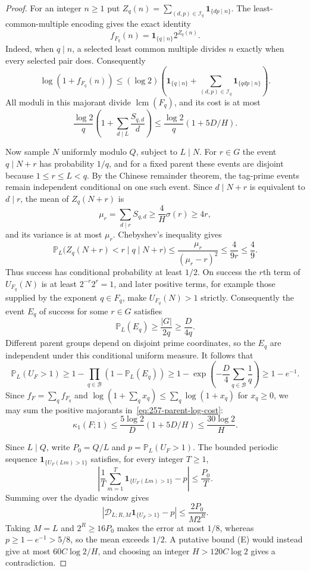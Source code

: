\begin{proof}
For an integer $n\ge1$ put
$Z_q(n)=\sum_{(d,p)\in\mathcal I_q}\mathbf1_{\{dp\mid n\}}$.
The least-common-multiple encoding gives the exact identity
\[
 f_{F_q}(n)=\mathbf1_{\{q\mid n\}}2^{Z_q(n)}.
\]
Indeed, when $q\mid n$, a selected least common multiple divides $n$
exactly when every selected pair does.  Consequently
\[
 \log(1+f_{F_q}(n))
 \le(\log2)\left(\mathbf1_{\{q\mid n\}}
          +\sum_{(d,p)\in\mathcal I_q}\mathbf1_{\{qdp\mid n\}}\right).
\]
All moduli in this majorant divide $\operatorname{lcm}(F_q)$,
and its cost is at most
\begin{equation}
 \frac{\log2}{q}\left(1+\sum_{d\mid L}\frac{S_{q,d}}d\right)
 \le\frac{\log2}{q}(1+5D/H).
 \label{eq:257-parent-log-cost}
\end{equation}

Now sample $N$ uniformly modulo $Q$, subject to $L\mid N$.
For $r\in G$ the event $q\mid N+r$ has probability $1/q$, and
for a fixed parent these events are disjoint because $1\le r\le L<q$.
By the Chinese remainder theorem, the tag-prime events remain independent
conditional on one such event.  Since $d\mid N+r$ is equivalent to
$d\mid r$, the mean of $Z_q(N+r)$ is
\[
 \mu_r=\sum_{d\mid r}S_{q,d}
 \ge\frac4H\sigma(r)\ge4r,
\]
and its variance is at most $\mu_r$.
Chebyshev's inequality gives
\[
 \mathbb P_L\bigl(Z_q(N+r)<r\mid q\mid N+r\bigr)
 \le\frac{\mu_r}{(\mu_r-r)^2}
 \le\frac4{9r}\le\frac49.
\]
Thus success has conditional probability at least $1/2$.
On success the $r$th term of $U_{F_q}(N)$ is at least
$2^{-r}2^r=1$, and later positive terms, for example those supplied by the
exponent $q\in F_q$, make $U_{F_q}(N)>1$ strictly.
Consequently the event $E_q$ of success for some $r\in G$ satisfies
\[
 \mathbb P_L(E_q)\ge\frac{|G|}{2q}\ge\frac{D}{4q}.
\]
Different parent groups depend on disjoint prime coordinates, so the
$E_q$ are independent under this conditional uniform measure.  It follows
that
\[
 \mathbb P_L(U_F>1)\ge
 1-\prod_{q\in\mathcal B}(1-\mathbb P_L(E_q))
 \ge1-\exp\left(-\frac D4\sum_{q\in\mathcal B}\frac1q\right)
 \ge1-e^{-1}.
\]
Since $f_F=\sum_qf_{F_q}$ and
$\log(1+\sum_qx_q)\le\sum_q\log(1+x_q)$ for $x_q\ge0$,
we may sum the positive majorants in~\eqref{eq:257-parent-log-cost}:
\[
 \kappa_1(F;1)\le\frac{5\log2}{D}(1+5D/H)
 \le\frac{30\log2}{H}.
\]

Since $L\mid Q$, write $P_0=Q/L$ and $p=\mathbb P_L(U_F>1)$.  The bounded periodic
sequence $\mathbf1_{\{U_F(Lm)>1\}}$ satisfies, for every integer $T\ge1$,
\[
 \left|\frac1T\sum_{m=1}^{T}\mathbf1_{\{U_F(Lm)>1\}}-p\right|
 \le\frac{P_0}{T}.
\]
Summing over the dyadic window gives
\[
 \left|\mathscr D_{L;R,M}\mathbf1_{\{U_F>1\}}-p\right|
 \le\frac{2P_0}{M2^R}.
\]
Taking $M=L$ and $2^R\ge16P_0$ makes the error at most $1/8$, whereas
$p\ge1-e^{-1}>5/8$, so the mean exceeds $1/2$.
A putative bound (E) would instead give at most $60C\log2/H$, and
choosing an integer $H>120C\log2$ gives a contradiction.
\end{proof}

